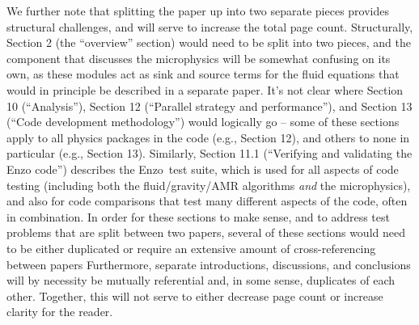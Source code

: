 \documentclass[11pt]{article}
\newcommand{\code}[1]{\textsf{#1}}
\newcommand{\enzo}{\code{Enzo}}
\begin{document}
We further note that splitting the paper up into two separate pieces
provides structural challenges, and will serve to increase the total
page count.  Structurally, Section 2 (the ``overview'' section) would
need to be split into two pieces, and the component that discusses the
microphysics will be somewhat confusing on its own, as these modules
act as sink and source terms for the fluid equations that would in
principle be described in a separate paper.  It's not clear where
Section 10 (``Analysis''), Section 12 (``Parallel strategy and
performance''), and Section 13 (``Code development methodology'')
would logically go -- some of these sections apply to all physics
packages in the code (e.g., Section 12), and others to none in
particular (e.g., Section 13).  Similarly, Section 11.1 (``Verifying
and validating the Enzo code'') describes the \enzo\ test suite, which
is used for all aspects of code testing (including both the
fluid/gravity/AMR algorithms \textit{and} the microphysics), and also
for code comparisons that test many different aspects of the code,
often in combination.  In order for these sections to make sense, and
to address test problems that are split between two papers, several of
these sections would need to be either duplicated or require an
extensive amount of cross-referencing between papers Furthermore,
separate introductions, discussions, and conclusions will by necessity
be mutually referential and, in some sense, duplicates of each other.
Together, this will not serve to either decrease page count or
increase clarity for the reader.


\newpage



\end{document}
